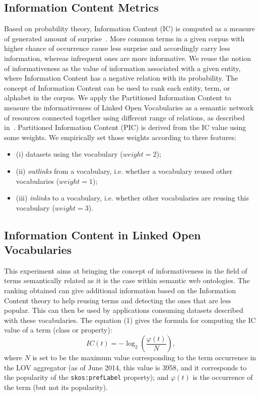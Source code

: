 \subsection{Information Content Metrics}
\label{sec:theory}
Based on probability theory, Information Content (IC) is computed as a measure of generated amount of surprise~\cite{ross02}. More common terms in a given corpus with higher chance of occurrence cause less surprise and accordingly carry less information, whereas infrequent ones are more informative. We reuse the notion of informativeness as the value of information associated with a given entity, where Information Content has a negative relation with its probability. The concept of Information Content can be used to rank each entity, term, or alphabet in the corpus. We apply the Partitioned Information Content to measure the informativeness of Linked Open Vocabularies as a semantic network of resources connected together using different range of relations, as described in~\cite{Meymandpour13}. Partitioned Information Content (PIC) is derived from the IC value using some weights. We empirically set those weights according to three features:
\begin{itemize}
 \item (i) datasets using the vocabulary ($weight = 2$);
 \item (ii) \textit{outlinks} from a vocabulary, i.e. whether a vocabulary reused other vocabularies ($weight = 1$);
 \item (iii) \textit{inlinks} to a vocabulary, i.e. whether other vocabularies are reusing this vocabulary ($weight = 3$).
\end{itemize}

\subsection{Information Content in Linked Open Vocabularies}
This experiment aims at bringing the concept of informativeness in the field of terms semantically related as it is the case within semantic web ontologies. The ranking obtained can give additional information based on the Information Content theory to help reusing terms and detecting the ones that are less popular. This can then be used by applications consuming datasets described with these vocabularies. The equation (1) gives the formula for computing the IC value of a term (class or property):
\begin{equation}
 IC(t) = -\log_2(\frac{\varphi(t)}{N}) ,
\end{equation}
where $N$ is set to be the maximum value corresponding to the term occurrence in the LOV aggregator (as of June 2014, this value is $3958$, and it corresponds to the popularity of the \texttt{skos:prefLabel} property); and $\varphi(t)$ is the occurrence of the term (but not its popularity).

